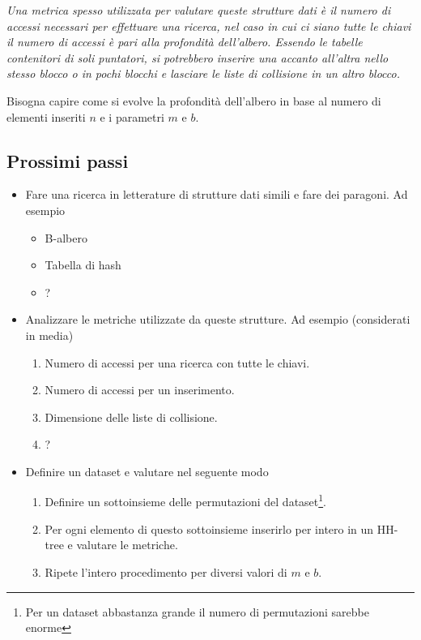 \documentclass[a4paper]{article}
\begin{document}
\textit{Una metrica spesso utilizzata per valutare queste strutture dati è il numero di accessi necessari per effettuare una ricerca, nel caso in cui ci siano tutte le chiavi il numero di accessi è pari alla profondità dell'albero. Essendo le tabelle contenitori di soli puntatori, si potrebbero inserire una accanto all'altra nello stesso blocco o in pochi blocchi e lasciare le liste di collisione in un altro blocco.}

Bisogna capire come si evolve la profondità dell'albero in base al numero di elementi inseriti $n$ e i parametri $m$ e $b$.

\subsection*{Prossimi passi}
\begin{itemize}
	\item Fare una ricerca in letterature di strutture dati simili e fare dei paragoni. Ad esempio
		\begin{itemize}
			\item B-albero
			\item Tabella di hash
			\item ?
		\end{itemize}
	\item Analizzare le metriche utilizzate da queste strutture. Ad esempio (considerati in media)
		\begin{enumerate}
			\item Numero di accessi per una ricerca con tutte le chiavi.
			\item Numero di accessi per un inserimento.
			\item Dimensione delle liste di collisione.
			\item ?
		\end{enumerate}
	\item Definire un dataset e valutare nel seguente modo
		\begin{enumerate}
			\item Definire un sottoinsieme delle permutazioni del dataset\footnote{Per un dataset abbastanza grande il numero di permutazioni sarebbe enorme}.
			\item Per ogni elemento di questo sottoinsieme inserirlo per intero in un HH-tree e valutare le metriche.
			\item Ripete l'intero procedimento per diversi valori di $m$ e $b$.
		\end{enumerate}
\end{itemize}
\end{document}
